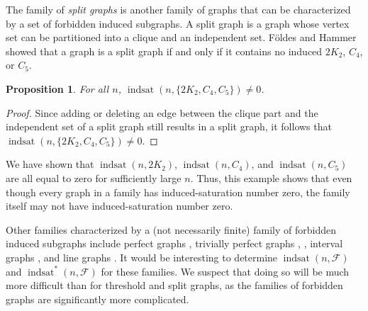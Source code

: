 \documentclass[12pt]{amsart}
\theoremstyle{plain}
\newtheorem{prop}[thm]{Proposition}
\theoremstyle{definition}
\newtheorem{ques}[thm]{Question}
\theoremstyle{remark}
\newcommand{\indsat}[2]{\ensuremath{\operatorname{indsat}(#1,#2)}\xspace}
\newcommand{\sis}[2]{\ensuremath{{\operatorname{indsat}}^*(#1,#2)}\xspace}
\begin{document}
The family of {\it split graphs} is another family of graphs that can be characterized by a set of forbidden induced subgraphs. A split graph is a graph whose vertex set can be partitioned into a clique and an independent set. F\"oldes and Hammer~\cite{FH} showed that a graph is a split graph if and only if it contains no induced $2K_2$, $C_4$, or $C_5$.

\begin{prop}\label{split}
For all $n$, $\indsat{n}{\{2K_2,C_4,C_5\}} \neq 0$.
\end{prop}
\begin{proof}
Since adding or deleting an edge between the clique part and the independent set of a split graph still results in a split graph, it follows that $\indsat{n}{\{2K_2, C_4, C_5\}} \neq 0$.
\end{proof}

We have shown that $\indsat{n}{2K_2}$, $\indsat{n}{C_4}$, and $\indsat{n}{C_5}$ are all equal to zero for sufficiently large $n$. Thus, this example shows that even though every graph in a family has induced-saturation number zero, the family itself may not have induced-saturation number zero.

Other families characterized by a (not necessarily finite) family of forbidden induced subgraphs include
perfect graphs \cite{CRST},
trivially perfect graphs \cite{W}, \cite{G},
interval graphs \cite{LB}, %
and line graphs \cite{B}.
It would be interesting to determine $\indsat{n}{\mathcal F}$ and $\sis{n}{\mathcal F}$ for these families. We suspect that doing so will be much more difficult than for threshold and split graphs, as the families of forbidden graphs are significantly more complicated.




\end{document}
